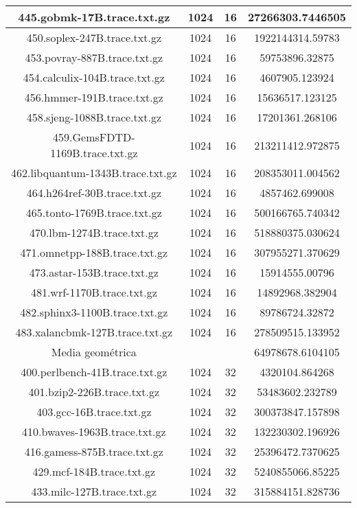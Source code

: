 \begin{table}[H]
\begin{center}
{\begin{tabular}{|c|c|c|c|}
		445.gobmk-17B.trace.txt.gz	&	1024	&	16	&	27266303.7446505	\\
		\hline
		450.soplex-247B.trace.txt.gz	&	1024	&	16	&	1922144314.59783	\\
		\hline
		453.povray-887B.trace.txt.gz	&	1024	&	16	&	59753896.32875	\\
		\hline
		454.calculix-104B.trace.txt.gz	&	1024	&	16	&	4607905.123924	\\
		\hline
		456.hmmer-191B.trace.txt.gz	&	1024	&	16	&	15636517.123125	\\
		\hline
		458.sjeng-1088B.trace.txt.gz	&	1024	&	16	&	17201361.268106	\\
		\hline
		459.GemsFDTD-1169B.trace.txt.gz	&	1024	&	16	&	213211412.972875	\\
		\hline
		462.libquantum-1343B.trace.txt.gz	&	1024	&	16	&	208353011.004562	\\
		\hline
		464.h264ref-30B.trace.txt.gz	&	1024	&	16	&	4857462.699008	\\
		\hline
		465.tonto-1769B.trace.txt.gz	&	1024	&	16	&	500166765.740342	\\
		\hline
		470.lbm-1274B.trace.txt.gz	&	1024	&	16	&	518880375.030624	\\
		\hline
		471.omnetpp-188B.trace.txt.gz	&	1024	&	16	&	307955271.370629	\\
		\hline
		473.astar-153B.trace.txt.gz	&	1024	&	16	&	15914555.00796	\\
		\hline
		481.wrf-1170B.trace.txt.gz	&	1024	&	16	&	14892968.382904	\\
		\hline
		482.sphinx3-1100B.trace.txt.gz	&	1024	&	16	&	89786724.32872	\\
		\hline
		483.xalancbmk-127B.trace.txt.gz	&	1024	&	16	&	278509515.133952	\\
		\hline
		\hline
		Media geométrica	&	&		&	64978678.6104105	\\
		\hline
		400.perlbench-41B.trace.txt.gz	&	1024	&	32	&	4320104.864268	\\
		\hline
		401.bzip2-226B.trace.txt.gz	&	1024	&	32	&	53483602.232789	\\
		\hline
		403.gcc-16B.trace.txt.gz	&	1024	&	32	&	300373847.157898	\\
		\hline
		410.bwaves-1963B.trace.txt.gz	&	1024	&	32	&	132230302.196926	\\
		\hline
		416.gamess-875B.trace.txt.gz	&	1024	&	32	&	25396472.7370625	\\
		\hline
		429.mcf-184B.trace.txt.gz	&	1024	&	32	&	5240855066.85225	\\
		\hline
		433.milc-127B.trace.txt.gz	&	1024	&	32	&	315884151.828736	\\

\end{tabular}}
\end{center}
\end{table}
